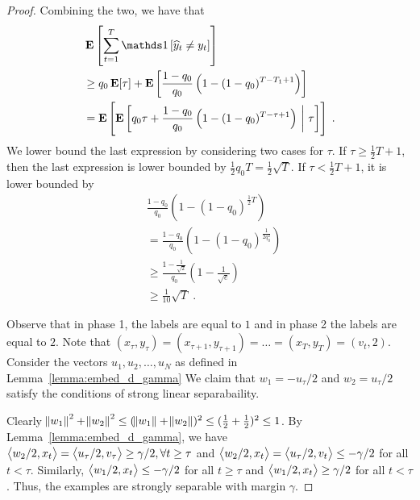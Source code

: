 \begin{proof}
Combining the two, we have that
\begin{align*}
& \Exp \left[\sum_{t=1}^T \indicator{\widehat y_t\neq y_t}\right] \nonumber \\
& \ge q_0 \Exp[\tau] + \Exp \left[\frac{1-q_0}{q_0}\left(1-(1-q_0)^{T-T_1+1}\right)\right] \\
& =  \Exp \left[ \Exp \left[ q_0 \tau + \frac{1-q_0}{q_0}\left(1-(1-q_0)^{T-\tau+1}\right) ~\middle|~ \tau \right] \right] \; .
\end{align*}
We lower bound the last expression by considering two cases for $\tau$.
If $\tau \ge \frac{1}{2}T + 1$, then the last expression is lower bounded by
$\frac{1}{2}q_0 T = \frac{1}{2} \sqrt{T}$. If
$\tau < \frac{1}{2}T+1$, it is lower bounded by
\begin{align*}
& \frac{1-q_0}{q_0}\left(1-(1-q_0)^{\frac{1}{2}T}\right) \\
& = \frac{1-q_0}{q_0}\left(1-(1-q_0)^{\frac{1}{2q_0^2}}\right) \\
& \ge \frac{1-\frac{1}{\sqrt{2}}}{q_0}\left(1-\frac{1}{\sqrt{e}}\right) \\
& \ge \frac{1}{10} \sqrt{T} \; .
\end{align*}

Observe that in phase 1, the labels are equal to $1$ and in phase 2 the labels
are equal to $2$. Note that $(x_\tau, y_\tau)=(x_{\tau+1}, y_{\tau+1})= \dots =
(x_T, y_T) = (v_t, 2)$. Consider the vectors $u_1, u_2, \dots, u_N$ as defined
in Lemma~\ref{lemma:embed_d_gamma} We claim that $w_1=-u_\tau/2$ and $w_2=u_\tau/2$
satisfy the conditions of strong linear separabaility.

Clearly $\norm{w_1}^2 + \norm{w_2}^2 \le (\norm{w_1} + \norm{w_2})^2 \le
(\frac{1}{2} + \frac{1}{2})^2 \le 1$. By Lemma~\ref{lemma:embed_d_gamma}, we
have $\left\langle w_2/2, x_t \right\rangle = \left\langle u_\tau/2, v_\tau \right\rangle \ge \gamma/2, \forall t \ge \tau$ and
$\left\langle w_2/2, x_t \right\rangle = \left\langle u_\tau/2, v_t \right\rangle \le - \gamma/2$ for all $t < \tau$. Similarly,
$\left\langle w_1/2, x_t \right\rangle \le -\gamma/2$ for all $t \ge \tau$ and $\left\langle w_1/2, x_t \right\rangle \ge
\gamma/2$ for all $t < \tau$. Thus, the examples are strongly separable with margin
$\gamma$.
\end{proof}
